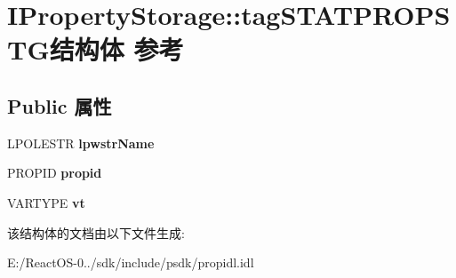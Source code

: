 \hypertarget{struct_i_property_storage_1_1tag_s_t_a_t_p_r_o_p_s_t_g}{}\section{I\+Property\+Storage\+:\+:tag\+S\+T\+A\+T\+P\+R\+O\+P\+S\+T\+G结构体 参考}
\label{struct_i_property_storage_1_1tag_s_t_a_t_p_r_o_p_s_t_g}
\subsection*{Public 属性}
\begin{DoxyCompactItemize}
\item 
\mbox{\label{struct_i_property_storage_1_1tag_s_t_a_t_p_r_o_p_s_t_g_aba81f12bbb15e03dc197b199276e4713}} 
L\+P\+O\+L\+E\+S\+TR {\bfseries lpwstr\+Name}
\item 
\mbox{\label{struct_i_property_storage_1_1tag_s_t_a_t_p_r_o_p_s_t_g_ae93a92f4177926ff702b545c02a4d8d9}} 
P\+R\+O\+P\+ID {\bfseries propid}
\item 
\mbox{\label{struct_i_property_storage_1_1tag_s_t_a_t_p_r_o_p_s_t_g_a7e0b3d49b326431fa067ee20d7e28de0}} 
V\+A\+R\+T\+Y\+PE {\bfseries vt}
\end{DoxyCompactItemize}


该结构体的文档由以下文件生成\+:\begin{DoxyCompactItemize}
\item 
E\+:/\+React\+O\+S-\/0../sdk/include/psdk/propidl.\+idl\end{DoxyCompactItemize}
